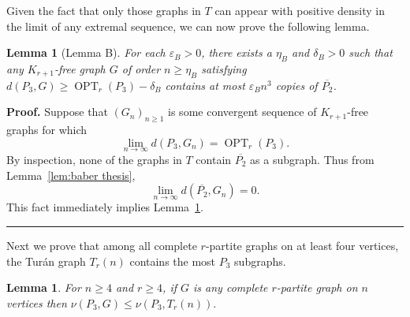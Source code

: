 \documentclass[12pt]{article}
\newtheorem{lemma}[thm]{Lemma}
\DeclareMathOperator{\OPT}{OPT}
\renewenvironment{proof}[1][Proof]{\textbf{#1.} }{\ \rule{0.5em}{0.5em}}
\begin{document}
Given the fact that only those graphs in $T$ can appear with positive density in the limit of any extremal sequence, we can now prove the following lemma.

\begin{lemma}[Lemma B]\label{lem:tight_graphs}
For each $\varepsilon_B > 0$, there exists a $\eta_B$ and $\delta_B > 0$ such
that any $K_{r+1}$-free graph $G$ of order $n \ge \eta_B$ satisfying $d(P_3,G)
\geq \OPT_r(P_3) - \delta_B$ contains at most $\varepsilon_B n^3$ copies of
$\overline{P_2}$. 
\end{lemma}

\begin{proof}
Suppose that $(G_n)_{n \geq 1}$ is some convergent sequence of $K_{r+1}$-free graphs for which 
\[ 
\lim\limits_{n \to \infty} d(P_3,G_n) = \OPT_r(P_3).
\]
By inspection, none of the graphs in $T$ contain $\overline{P_2}$ as a subgraph. Thus from Lemma~\ref{lem:baber thesis},
\[ \lim\limits_{n \to \infty} d(\overline{P_2},G_n) = 0.\]
This fact immediately implies Lemma~\ref{lem:tight_graphs}.
\end{proof}

Next we prove that among all complete $r$-partite graphs on at least four
vertices, the Tur\'{a}n graph $T_r(n)$ contains the most $P_3$ subgraphs.

\begin{lemma}\label{lem:rpartite_turan_best}
For $n \geq 4$ and $r \geq 4$, if $G$ is any complete $r$-partite graph on $n$
vertices then $\nu(P_3,G) \leq \nu(P_3,T_r(n)).$
\end{lemma}
\end{document}

